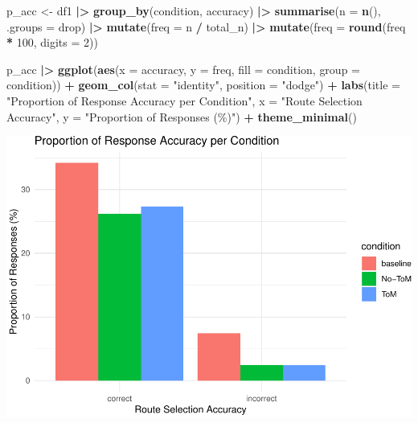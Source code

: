 \documentclass[
]{article}
\newenvironment{Shaded}{\begin{snugshade}}{\end{snugshade}}
\newcommand{\AttributeTok}[1]{\textcolor[rgb]{0.13,0.29,0.53}{#1}}
\newcommand{\DecValTok}[1]{\textcolor[rgb]{0.00,0.00,0.81}{#1}}
\newcommand{\FunctionTok}[1]{\textcolor[rgb]{0.13,0.29,0.53}{\textbf{#1}}}
\newcommand{\NormalTok}[1]{#1}
\newcommand{\OtherTok}[1]{\textcolor[rgb]{0.56,0.35,0.01}{#1}}
\newcommand{\SpecialCharTok}[1]{\textcolor[rgb]{0.81,0.36,0.00}{\textbf{#1}}}
\newcommand{\StringTok}[1]{\textcolor[rgb]{0.31,0.60,0.02}{#1}}
\begin{document}
\begin{Shaded}
\begin{Highlighting}[]
\NormalTok{p\_acc }\OtherTok{\textless{}{-}}
\NormalTok{  df1 }\SpecialCharTok{|\textgreater{}}
  \FunctionTok{group\_by}\NormalTok{(condition, }
\NormalTok{           accuracy) }\SpecialCharTok{|\textgreater{}}
  \FunctionTok{summarise}\NormalTok{(}\AttributeTok{n =} \FunctionTok{n}\NormalTok{(), }
            \AttributeTok{.groups =} \StringTok{\textquotesingle{}drop\textquotesingle{}}\NormalTok{) }\SpecialCharTok{|\textgreater{}} 
  \FunctionTok{mutate}\NormalTok{(}\AttributeTok{freq =}\NormalTok{ n }\SpecialCharTok{/}\NormalTok{ total\_n) }\SpecialCharTok{|\textgreater{}}
  \FunctionTok{mutate}\NormalTok{(}\AttributeTok{freq =} \FunctionTok{round}\NormalTok{(freq }\SpecialCharTok{*} \DecValTok{100}\NormalTok{, }\AttributeTok{digits =} \DecValTok{2}\NormalTok{))}

\NormalTok{p\_acc }\SpecialCharTok{|\textgreater{}}  
  \FunctionTok{ggplot}\NormalTok{(}\FunctionTok{aes}\NormalTok{(}\AttributeTok{x =}\NormalTok{ accuracy,}
                \AttributeTok{y =}\NormalTok{ freq,}
                \AttributeTok{fill =}\NormalTok{ condition,}
                \AttributeTok{group =}\NormalTok{ condition)) }\SpecialCharTok{+} 
  \FunctionTok{geom\_col}\NormalTok{(}\AttributeTok{stat =} \StringTok{"identity"}\NormalTok{,}
           \AttributeTok{position =} \StringTok{"dodge"}\NormalTok{) }\SpecialCharTok{+}
  \FunctionTok{labs}\NormalTok{(}\AttributeTok{title =} \StringTok{"Proportion of Response Accuracy per Condition"}\NormalTok{,}
       \AttributeTok{x =} \StringTok{"Route Selection Accuracy"}\NormalTok{,}
       \AttributeTok{y =} \StringTok{"Proportion of Responses (\%)"}\NormalTok{) }\SpecialCharTok{+}
  \FunctionTok{theme\_minimal}\NormalTok{()}
\end{Highlighting}
\end{Shaded}

\includegraphics{T5_Data_wrangling_pdf_files/figure-latex/unnamed-chunk-22-1.pdf}
\end{document}

